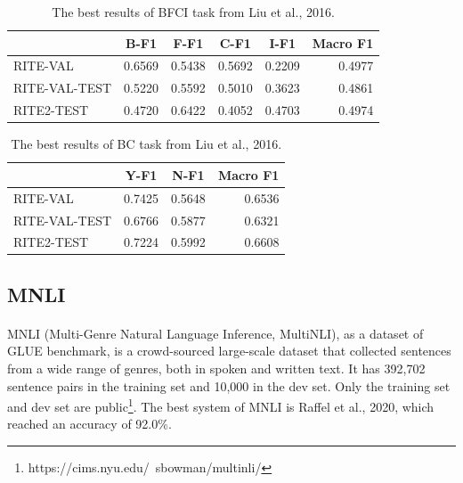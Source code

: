 \documentclass{article}
\begin{document}
\begin{CJK*}{UTF8}{bkai}
\begin{table}[ht!]
  \centering
  \begin{tabular}{|l|r|r|r|r|r|}
  \hline
   & \multicolumn{1}{c|}{B-F1} & \multicolumn{1}{c|}{F-F1} & \multicolumn{1}{c|}{C-F1} & \multicolumn{1}{c|}{I-F1} & \multicolumn{1}{c|}{Macro F1} \\ \hline
  RITE-VAL & 0.6569 & 0.5438 & 0.5692 & 0.2209 & 0.4977 \\ \hline
  RITE-VAL-TEST & 0.5220 & 0.5592 & 0.5010 & 0.3623 & 0.4861 \\ \hline
  RITE2-TEST & 0.4720 & 0.6422 & 0.4052 & 0.4703 & 0.4974 \\ \hline
  \end{tabular}
  \caption{The best results of BFCI task from Liu et al., 2016.}
  \label{result:bfci_liu_2016}
\end{table}

\begin{table}[ht!]
  \centering
  \begin{tabular}{|l|r|r|r|}
  \hline
   & \multicolumn{1}{c|}{Y-F1} & \multicolumn{1}{c|}{N-F1} & \multicolumn{1}{c|}{Macro F1} \\ \hline
  RITE-VAL & 0.7425 & 0.5648 & 0.6536 \\ \hline
  RITE-VAL-TEST & 0.6766 & 0.5877 & 0.6321 \\ \hline
  RITE2-TEST & 0.7224 & 0.5992 & 0.6608 \\ \hline
  \end{tabular}
  \caption{The best results of BC task from Liu et al., 2016.}
  \label{result:bc_liu_2016}
\end{table}

\subsection{MNLI}
\paragraph{}
MNLI (Multi-Genre Natural Language Inference, MultiNLI), as a dataset of GLUE benchmark, is a crowd-sourced large-scale dataset that collected sentences from a wide range of genres, both in spoken and written text. It has 392,702 sentence pairs in the training set and 10,000 in the dev set. Only the training set and dev set are public\footnote{https://cims.nyu.edu/~sbowman/multinli/}. The best system of MNLI is Raffel et al., 2020\cite{raffel2020t5}, which reached an accuracy of 92.0\%.


\end{CJK*}
\end{document}
